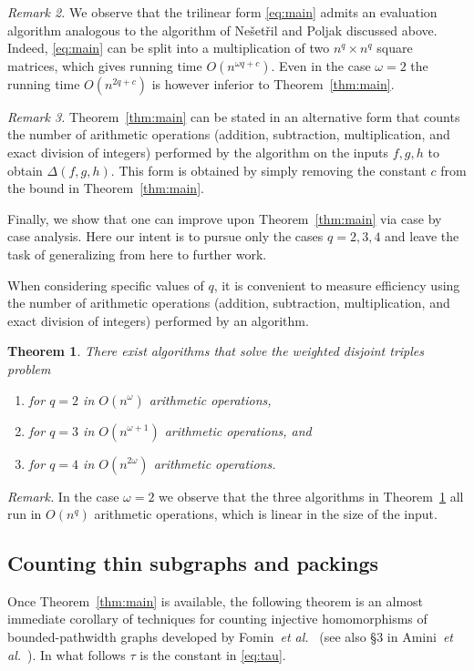 \documentclass{amsart}
\newtheorem{Thm}{Theorem}
\begin{document}
\medskip
\noindent
{\em Remark 2.} 
We observe that the trilinear form \eqref{eq:main} admits an evaluation 
algorithm analogous to the algorithm of 
Ne\v{s}et\v{r}il and Poljak \cite{NP85} discussed above. 
Indeed, \eqref{eq:main} can be split into a multiplication of two
$n^{q}\times n^{q}$ square matrices, which gives running time
$O(n^{\omega q+c})$. Even in the case $\omega=2$ the running
time $O(n^{2q+c})$ is however inferior to Theorem~\ref{thm:main}.

\medskip
\noindent
{\em Remark 3.} 
Theorem~\ref{thm:main} can be stated in an alternative form that
counts the number of arithmetic operations (addition, subtraction, 
multiplication, and exact division of integers) performed by the 
algorithm on the inputs $f,g,h$ to obtain $\Delta(f,g,h)$. 
This form is obtained by simply removing the constant $c$ from 
the bound in Theorem~\ref{thm:main}. 

Finally, we show that one can improve upon Theorem~\ref{thm:main}
via case by case analysis. Here our intent is to pursue only the 
cases $q=2,3,4$ and leave the task of generalizing from here to
further work. 

When considering specific values of $q$, it is convenient to 
measure efficiency using the number of arithmetic operations 
(addition, subtraction, multiplication, and exact division of 
integers) performed by an algorithm. 

\begin{Thm}
\label{thm:q234}
There exist algorithms that solve the weighted disjoint triples 
problem 
\begin{enumerate}
\item
for $q=2$ in $O(n^{\omega})$ arithmetic operations,
\item
for $q=3$ in $O(n^{\omega+1})$ arithmetic operations, and
\item
for $q=4$ in $O(n^{2\omega})$ arithmetic operations.
\end{enumerate}
\end{Thm}

{\em Remark.} In the case $\omega=2$ we observe that the three
algorithms in Theorem~\ref{thm:q234} all run in $O(n^q)$ 
arithmetic operations, which is linear in the size of the input.

\subsection{Counting thin subgraphs and packings}

Once Theorem~\ref{thm:main} is available, the following theorem is an 
almost immediate corollary of techniques for counting injective 
homomorphisms of bounded-pathwidth graphs developed by 
Fomin~{\em et al.}~\cite{FLRRS12} 
(see also \S3 in Amini~{\em et al.}~\cite{AFS12}).
In what follows $\tau$ is the constant in \eqref{eq:tau}. 
\end{document}
